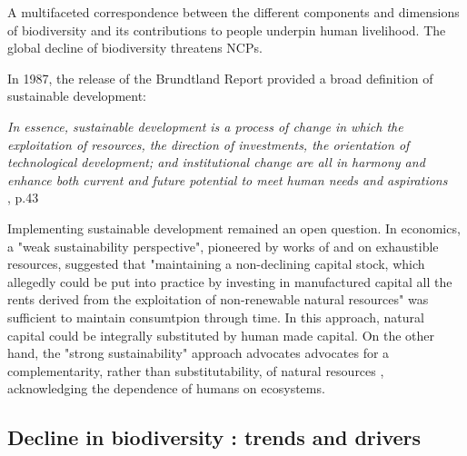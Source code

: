 A multifaceted correspondence between the different components and dimensions of biodiversity and its contributions to people underpin human livelihood. The global decline of biodiversity threatens NCPs.

\clearpage
\begin{tcolorbox}[breakable, 
colback=verylightgray, 
colframe=gray!75!black, 
title= {Box 1 - Weak v. Strong Sustainability},
fontupper=\small]
\par %
\justifying %

In 1987, the release of the Brundtland Report \citep{brundtland} provided a broad definition of sustainable development: 

\begin{displayquote}
\textit{In essence, sustainable development is a process of change in which the exploitation of
resources, the direction of investments, the orientation of technological development; and institutional change are all in harmony and enhance both current and future potential to meet human needs and aspirations}\\
\hspace*{\fill}\small{\cite{brundtland}, p.43}
\end{displayquote}

Implementing sustainable development remained an open question. In economics, a "weak sustainability perspective", pioneered by works of \cite{hartwick_intergenerational_1977} and \cite{solow_intergenerational_1986} on exhaustible resources, suggested that "maintaining a non-declining capital stock, which allegedly could be put into practice by investing in manufactured capital all the rents derived from the exploitation of non-renewable natural resources" \citep{gomez_history_2010} was sufficient to maintain consumtpion through time. In this approach, natural capital could be integrally substituted by human made capital. On the other hand, the "strong sustainability" approach advocates advocates for a complementarity, rather than substitutability, of natural resources \citep{costanza_daly}, acknowledging the dependence of humans on ecosystems.
\end{tcolorbox}

{}
\subsection*{Decline in biodiversity : trends and drivers}

